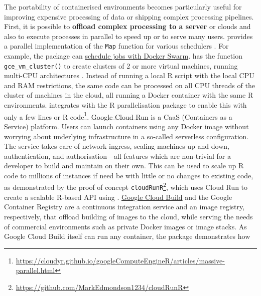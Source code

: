 The portability of containerised environments becomes particularly
useful for improving expensive processing of data or shipping complex
processing pipelines. First, it is possible to \textbf{offload complex
processing to a server} or clouds and also to execute processes in
parallel to speed up or to serve many users.
\textbf{} provides a parallel implementation of the
\texttt{Map} function for various schedulers \citep{Lang2017batchtools}.
For example, the package can
\href{https://mllg.github.io/batchtools/reference/makeClusterFunctionsDocker.html}{schedule
jobs with Docker Swarm}. \textbf{} has the
function \texttt{gce\_vm\_cluster()} to create clusters of 2 or more
virtual machines, running multi-CPU architectures
\citep{googleComputeEngineR_2019}. Instead of running a local R script
with the local CPU and RAM restrictions, the same code can be processed
on all CPU threads of the cluster of machines in the cloud, all running
a Docker container with the same R environments.
 integrates with the R parallelisation
package  \citep{cran_future} to enable this with only a
few lines or R
code\footnote{\href{https://cloudyr.github.io/googleComputeEngineR/articles/massive-parallel.html}{https://cloudyr.github.io/googleComputeEngineR/articles/massive-parallel.html}}.
\href{https://cloud.run}{Google Cloud Run} is a CaaS (Containers as a
Service) platform. Users can launch containers using any Docker image
without worrying about underlying infrastructure in a so-called
serverless configuration. The service takes care of network ingress,
scaling machines up and down, authentication, and authorisation---all
features which are non-trivial for a developer to build and maintain on
their own. This can be used to scale up R code to millions of instances
if need be with little or no changes to existing code, as demonstrated
by the proof of concept
\texttt{cloudRunR}\footnote{\href{https://github.com/MarkEdmondson1234/cloudRunR}{https://github.com/MarkEdmondson1234/cloudRunR}},
which uses Cloud Run to create a scalable R-based API using
 \citep{cran_plumber}.
\href{https://cloud.google.com/cloud-build/}{Google Cloud Build} and the
Google Container Registry are a continuous integration service and an
image registry, respectively, that offload building of images to the
cloud, while serving the needs of commercial environments such as
private Docker images or image stacks. As Google Cloud Build itself can
run any container, the package  demonstrates how
